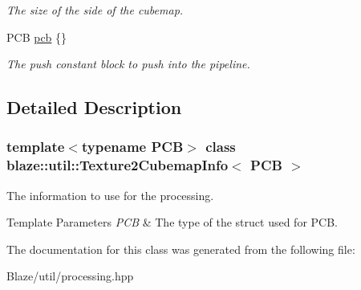 \begin{DoxyCompactItemize}
\begin{DoxyCompactList}\small\item\em The size of the side of the cubemap. \end{DoxyCompactList}\item 
\mbox{\label{structblaze_1_1util_1_1Texture2CubemapInfo_a6bf41f7f9f62e7e22c33aff36e6804fa}} 
P\+CB \hyperlink{structblaze_1_1util_1_1Texture2CubemapInfo_a6bf41f7f9f62e7e22c33aff36e6804fa}{pcb} \{\}
\begin{DoxyCompactList}\small\item\em The push constant block to push into the pipeline. \end{DoxyCompactList}\end{DoxyCompactItemize}


\subsection{Detailed Description}
\subsubsection*{template$<$typename P\+CB$>$\newline
class blaze\+::util\+::\+Texture2\+Cubemap\+Info$<$ P\+C\+B $>$}

The information to use for the processing. 


\begin{DoxyTemplParams}{Template Parameters}
{\em P\+CB} & The type of the struct used for P\+CB. \\
\hline
\end{DoxyTemplParams}


The documentation for this class was generated from the following file\+:\begin{DoxyCompactItemize}
\item 
Blaze/util/processing.\+hpp\end{DoxyCompactItemize}
